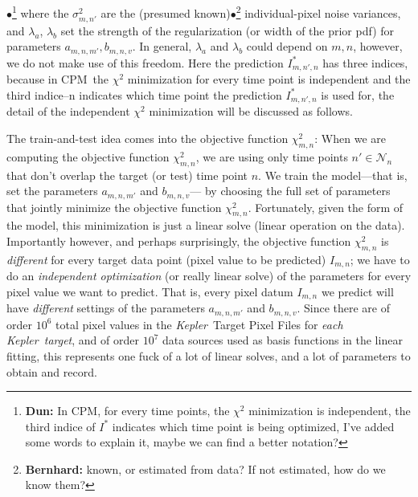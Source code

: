 \documentclass[12pt, preprint]{aastex}
\newcommand{\project}[1]{\textsl{#1}}
\newcommand{\Kepler}{\project{Kepler}}
\newcommand{\name}{CPM}
\newcommand{\set}[1]{\mathcal{#1}}
\newcommand{\Bernhard}[1]{$\bullet$\footnote{{\bf Bernhard:} #1}}
\newcommand{\Dun}[1]{$\bullet$\footnote{{\bf Dun:} #1}}
\begin{document}
\Dun{In CPM,  for every time points,  the $\chi^2$ minimization is independent, the third indice of $I^{\ast}$ indicates which time point is being optimized, I've added some words to explain it,  maybe we can find a better notation?}
where the $\sigma^2_{m,n'}$ are the (presumed known)\Bernhard{known, or estimated from data? 
  If not estimated, how do we know them?} individual-pixel noise variances, and $\lambda_{a}$, 
  $\lambda_{b}$ set the strength of the regularization (or width of the prior pdf) for parameters $a_{m,n,m'}, b_{m,n,v}$. 
  In general, $\lambda_a$ and $\lambda_b$ could depend on $m,n$, however, we do not make use of this freedom. 
  Here the prediction $I^{\ast}_{m,n',n}$ has three indices, because in \name\ the $\chi^2$ minimization for every time
  point is independent and the third indice--n indicates which time point the prediction $I^{\ast}_{m,n',n}$ is used for, 
  the detail of the independent $\chi^2$ minimization will be discussed as follows.

The train-and-test idea comes into the objective function $\chi^2_{m,n}$:
When we are computing the objective function $\chi^2_{m,n}$,
  we are using only time points $n'\in\set{N}_n$ that don't overlap the target (or test) time point $n$.
We train the model---that is, set the parameters $a_{m,n,m'}$ and $b_{m,n,v}$---%
  by choosing the full set of parameters that jointly minimize the objective function $\chi^2_{m,n}$.
Fortunately, given the form of the model,
  this minimization is just a linear solve (linear operation on the data).
Importantly however, and perhaps surprisingly, the objective function $\chi^2_{m,n}$ is \emph{different}
  for every target data point (pixel value to be predicted) $I_{m,n}$;
  we have to do an \emph{independent optimization} (or really linear solve)
  of the parameters for every pixel value we want to predict.
That is, every pixel datum $I_{m,n}$ we predict will have
  \emph{different} settings of the parameters $a_{m,n,m'}$ and $b_{m,n,v}$.
Since there are of order $10^{6}$ total pixel values in the \Kepler\ Target Pixel Files for \emph{each \Kepler\ target},
  and of order $10^7$ data sources used as basis functions in the linear fitting,
  this represents one fuck of a lot of linear solves,
  and a lot of parameters to obtain and record.
\end{document}
